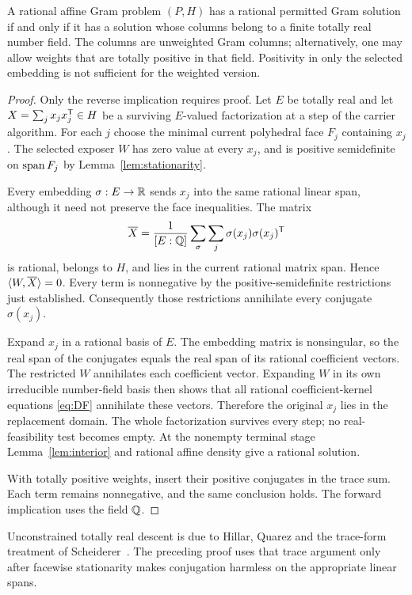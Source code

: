 \begin{theorem}\label{thm:descent}
A rational affine Gram problem $(P,H)$ has a rational permitted Gram solution if and only if it has a solution whose columns belong to a finite totally real number field. The columns are unweighted Gram columns; alternatively, one may allow weights that are totally positive in that field. Positivity in only the selected embedding is not sufficient for the weighted version.
\end{theorem}
\begin{proof}
Only the reverse implication requires proof. Let $E$ be totally real and let $X=\sum_jx_jx_j^{\mathsf T}\in H$ be a surviving $E$-valued factorization at a step of the carrier algorithm. For each $j$ choose the minimal current polyhedral face $F_j$ containing $x_j$. The selected exposer $W$ has zero value at every $x_j$, and is positive semidefinite on $\operatorname{span} F_j$ by Lemma~\ref{lem:stationarity}.

Every embedding $\sigma:E\to\mathbb R$ sends $x_j$ into the same rational linear span, although it need not preserve the face inequalities. The matrix
\[
 \overline X=\frac1{[E:\mathbb Q]}\sum_\sigma\sum_j\sigma(x_j)\sigma(x_j)^{\mathsf T}
\]
is rational, belongs to $H$, and lies in the current rational matrix span. Hence $\langle W,\overline X\rangle=0$. Every term is nonnegative by the positive-semidefinite restrictions just established. Consequently those restrictions annihilate every conjugate $\sigma(x_j)$.

Expand $x_j$ in a rational basis of $E$. The embedding matrix is nonsingular, so the real span of the conjugates equals the real span of its rational coefficient vectors. The restricted $W$ annihilates each coefficient vector. Expanding $W$ in its own irreducible number-field basis then shows that all rational coefficient-kernel equations \eqref{eq:DF} annihilate these vectors. Therefore the original $x_j$ lies in the replacement domain. The whole factorization survives every step; no real-feasibility test becomes empty. At the nonempty terminal stage Lemma~\ref{lem:interior} and rational affine density give a rational solution.

With totally positive weights, insert their positive conjugates in the trace sum. Each term remains nonnegative, and the same conclusion holds. The forward implication uses the field $\mathbb Q$.
\end{proof}

Unconstrained totally real descent is due to Hillar, Quarez and the trace-form treatment of Scheiderer~\cite{Hillar,Scheiderer}. The preceding proof uses that trace argument only after facewise stationarity makes conjugation harmless on the appropriate linear spans.

